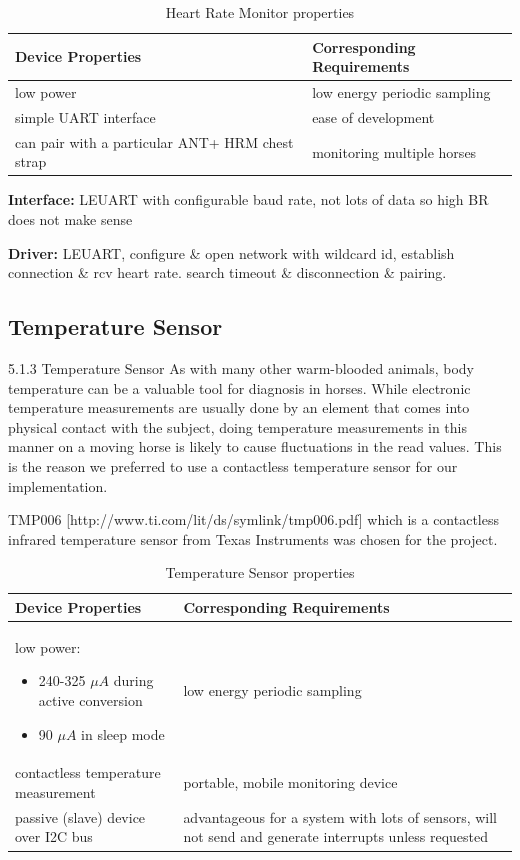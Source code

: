 \begin{table}
\centering
\begin{tabular}{|m{}|m{}|}
\hline 
	\textbf{Device Properties} &
	\textbf{Corresponding Requirements}  \\ 
\hline
	low power  &
	low energy periodic sampling  \\ 
\hline
	simple UART interface &
	ease of development \\
\hline
	can pair with a particular ANT+ HRM chest strap &
	monitoring multiple horses \\
\hline 
\end{tabular} 
\caption{Heart Rate Monitor properties}
\label{tab:hrm_properties}
\end{table}

\textbf{Interface:}  LEUART with configurable baud rate, not lots of data so high BR does not make sense

\textbf{Driver:}
 LEUART, configure \& open network with wildcard id, establish connection \& rcv heart rate. search timeout \& disconnection \& pairing.


\subsection{Temperature Sensor}
5.1.3 Temperature Sensor
As with many other warm-blooded animals, body temperature can be a valuable tool for diagnosis in horses. While electronic temperature measurements are usually done by an element that comes into physical contact with the subject, doing temperature measurements in this manner on a moving horse is likely to cause fluctuations in the read values. This is the reason we preferred to use a contactless temperature sensor for our implementation. 

 TMP006 [http://www.ti.com/lit/ds/symlink/tmp006.pdf] which is a contactless infrared temperature sensor from Texas Instruments was chosen for the project. 


\begin{table}
\centering
\begin{tabular}{|m{}|m{}|}
\hline 
	\textbf{Device Properties} &
	\textbf{Corresponding Requirements}  \\ 
\hline
	low power:
	\begin{itemize}
	\item 240-325 $\mu A$ during active conversion
	\item 90 $\mu A$ in sleep mode 
	\end{itemize}  &
	low energy periodic sampling  \\ 
\hline
	contactless temperature measurement &
	portable, mobile monitoring device \\
\hline
	passive (slave) device over I2C bus &
	advantageous for a system with lots of sensors, will not send and generate interrupts unless requested \\
\hline 
\end{tabular} 
\caption{Temperature Sensor properties}
\label{tab:temp_sensor_properties}
\end{table}

